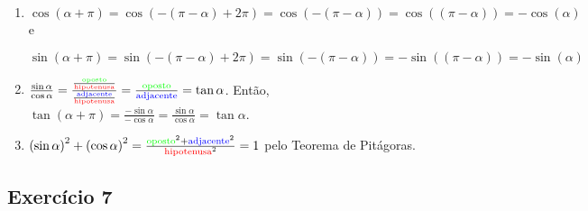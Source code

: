 \begin{enumerate}
\item $\cos \left(\alpha + \pi\right) =
  \cos \left(-\left(\pi-\alpha\right) + 2\pi\right) = 
  \cos \left(-\left(\pi-\alpha\right)\right) =
  \cos \left(\left(\pi-\alpha\right)\right) = -\cos(\alpha)$ e

$\sin \left(\alpha + \pi\right) =
  \sin \left(-\left(\pi-\alpha\right) + 2\pi\right) = 
  \sin \left(-\left(\pi-\alpha\right)\right) =
  -\sin \left(\left(\pi-\alpha\right)\right) = -\sin(\alpha)$
\item $\frac{\sin \alpha}{\cos \alpha} =
\frac{\frac{\color{green}{\text{oposto}}}{\text{\color{red}{\text{hipotenusa}}}}}{\frac{\color{blue}{\text{adjacente}}}{\text{\color{red}{\text{hipotenusa}}}}} = 
\frac{\color{green}{\text{oposto}}}{\color{blue}{\text{adjacente}}} =
{\tan \alpha}$. Então, 
$\tan \left(\alpha+\pi\right) = \frac{-\sin \alpha}{-\cos \alpha} =
\frac{\sin \alpha}{\cos \alpha} = {\tan \alpha}$.

\item $\left(\sin \alpha\right)^2 + \left(\cos \alpha\right)^2 = 
  \frac{{\color{green}{\text{oposto}}}^2
    +{\color{blue}{\text{adjacente}}}^2
    }{\text{\color{red}{\text{hipotenusa}}}^2} = 1$ pelo Teorema de Pitágoras.
\end{enumerate}

\subsection{Exercício 7}

